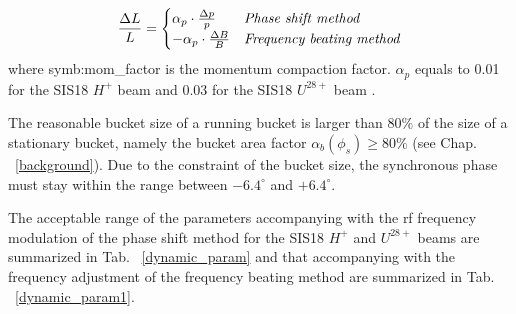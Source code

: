 \begin{eqnarray}
\frac{\Delta L}{L}=
\begin{cases}
\alpha_p \cdot\frac{\Delta p}{p} &\textit{Phase shift method}\cr
-\alpha_p \cdot\frac{\Delta B}{B} & \textit{Frequency beating method}\cr
\end{cases}
\end{eqnarray}
where \gls{symb:mom_factor} is the momentum compaction factor. $\alpha_p$ equals to 0.01 for the SIS18 $H^+$ beam and 0.03 for the SIS18 $U^\mathit{28+}$ beam \cite{liebermann_fair_2013}.  

The reasonable bucket size of a running bucket is larger than $80\%$ of the size of a stationary bucket, namely the bucket area factor $\alpha_b(\phi_{s})\ge 80\%$ (see Chap. ~\ref{background}). Due to the constraint of the bucket size, the synchronous phase must stay within the range between $-6.4^\circ$ and $+6.4^\circ$.

The acceptable range of the parameters accompanying with the rf frequency modulation of the phase shift method for the SIS18 $H^{+}$ and $U^\mathit{28+}$ beams are summarized in Tab. ~\ref{dynamic_param} and that accompanying with the frequency adjustment of the frequency beating method are summarized in Tab. ~\ref{dynamic_param1}. 

